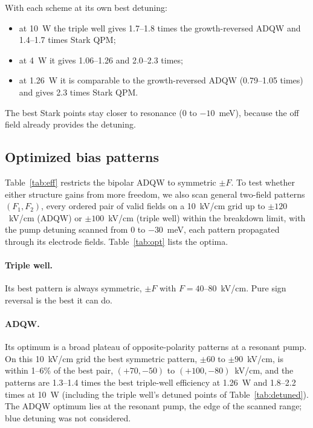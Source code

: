 \documentclass[11pt]{article}
\begin{document}
With each scheme at its own best detuning:
\begin{itemize}
\item at 10~W the triple well gives 1.7--1.8 times the growth-reversed ADQW and 1.4--1.7 times Stark QPM;
\item at 4~W it gives 1.06--1.26 and 2.0--2.3 times;
\item at 1.26~W it is comparable to the growth-reversed ADQW (0.79--1.05 times) and gives 2.3 times Stark QPM.
\end{itemize}
The best Stark points stay closer to resonance ($0$ to $-10$~meV), because the off field already provides the detuning.

\subsection{Optimized bias patterns}\label{sec:opt}
Table~\ref{tab:eff} restricts the bipolar ADQW to symmetric $\pm F$. To test whether either structure gains from more freedom, we also scan general two-field patterns $(F_1,F_2)$, every ordered pair of valid fields on a 10~kV/cm grid up to $\pm120$~kV/cm (ADQW) or $\pm100$~kV/cm (triple well) within the breakdown limit, with the pump detuning scanned from 0 to $-30$~meV, each pattern propagated through its electrode fields. Table~\ref{tab:opt} lists the optima.

\paragraph{Triple well.} Its best pattern is always symmetric, $\pm F$ with $F=40$--80~kV/cm. Pure sign reversal is the best it can do.

\paragraph{ADQW.} Its optimum is a broad plateau of opposite-polarity patterns at a resonant pump. On this 10~kV/cm grid the best symmetric pattern, $\pm60$ to $\pm90$~kV/cm, is within 1--6\% of the best pair, $(+70,-50)$ to $(+100,-80)$~kV/cm, and the patterns are 1.3--1.4 times the best triple-well efficiency at 1.26~W and 1.8--2.2 times at 10~W (including the triple well's detuned points of Table~\ref{tab:detuned}). The ADQW optimum lies at the resonant pump, the edge of the scanned range; blue detuning was not considered.
\end{document}
